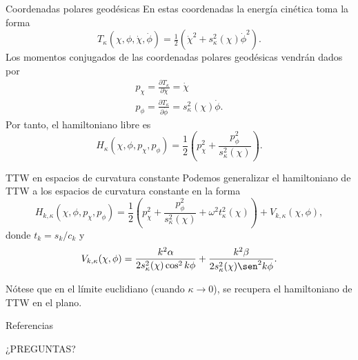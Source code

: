 \documentclass[aspectratio=169,mathserif]{beamer}
\begin{document}
 \begin{frame}{Coordenadas polares geodésicas}
  En estas coordenadas la energía cinética toma la forma
  \begin{equation*}
    T_{\kappa}(\chi,\phi,\dot{\chi},\dot{\phi})=\tfrac{1}{2}(\dot{\chi}^2+s_{\kappa}^2(\chi)\dot{\phi}^2).
  \end{equation*}
  \pause
 Los momentos conjugados de las coordenadas polares geodésicas vendrán dados por
 \begin{align*}
   p_{\chi}=\frac{\partial T_{\kappa}}{\partial \dot{\chi}}= \dot{\chi} \\
   p_{\phi}=\frac{\partial T_{\kappa}}{\partial \dot{\phi}}= s_\kappa^2(\chi)\dot{\phi}. 
 \end{align*}
  \pause
 Por tanto, el hamiltoniano libre es
 \begin{equation*}
   H_{\kappa}(\chi,\phi,p_\chi,p_\phi)=\frac{1}{2}\left( p_{\chi}^2 + \frac{p_\phi ^2}{s_\kappa^2(\chi)} \right).
 \end{equation*}
  
 \end{frame}

 \begin{frame}{TTW en espacios de curvatura constante}
   Podemos generalizar el hamiltoniano de TTW a los espacios de curvatura constante en la forma
   \begin{equation*}
     H_{k,\kappa}(\chi,\phi,p_\chi,p_\phi)=\frac{1}{2}\left( p_\chi^2+ \frac{p_\phi^2}{s^2_{\kappa}(\chi)}+\omega^2 t^2_{\kappa}(\chi) \right)+V_{k,\kappa}(\chi,\phi),
   \end{equation*}
   donde $t_k=s_k/c_k$ y
   \begin{equation*}
     V_{k,\kappa}(\chi,\phi)=\frac{k^2 \alpha}{2s_{\kappa}^2(\chi)\cos^2k\phi}+\frac{k^2 \beta}{2s_{\kappa}^2(\chi)\sen^2k\phi}.
   \end{equation*}

  \pause
   Nótese que en el límite euclidiano (cuando $\kappa\rightarrow 0$), se recupera el hamiltoniano de TTW en el plano.
 \end{frame}

 \begin{frame}{Referencias}
   \nocite{*}
   
   
 \end{frame}

 \begin{frame}
   \centering
   \Huge ¿PREGUNTAS?
 \end{frame}
\end{document}
